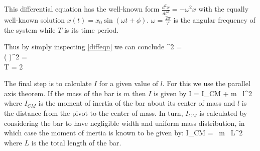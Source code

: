    This differential equation has the well-known form $\frac{d^2 x}{dt^2} = - \omega^2 x$ with the equally well-known solution $x(t) = x_0 \sin(\omega t + \phi)$. $\omega = \frac{2 \pi}{T}$ is the angular frequency of the system while $T$ is its time period. 
   
   
   
   Thus by simply inspecting \eqref{diffeqn} we can conclude
   \beqc
      \omega^2 = \\
      \imply \big(  \big)^2 = \\
      \imply T = 2 \pi {}
   \eeqc



   The final step is to calculate $I$ for a given value of $l$. For this we use the parallel axis theorem. If the mass of the bar is $m$ then $I$ is given by
   \beq \label{parallel_axis}
      I = I_{CM} + m \, l^2
   \eeq
   where $I_{CM}$ is the moment of inertia of the bar about its center of mass and $l$ is the distance from the pivot to the center of mass. In turn, $I_{CM}$ is calculated by considering the bar to have negligible width and uniform mass distribution, in which case the moment of inertia is known to be given by:
   \beq \label{ICM}
      I_{CM} =  \, m \, L^2
   \eeq
   where $L$ is the total length of the bar.

